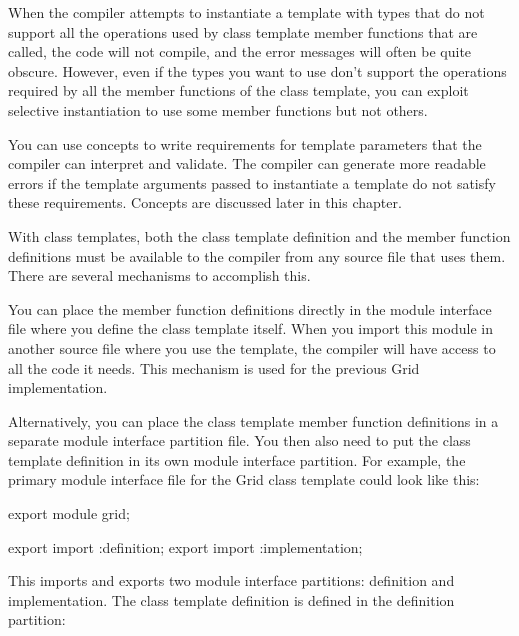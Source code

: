 When the compiler attempts to instantiate a template with types that do not support all the operations used by class template member functions that are called, the code will not compile, and the error messages will often be quite obscure. However, even if the types you want to use don’t support the operations required by all the member functions of the class template, you can exploit selective instantiation to use some member functions but not others.

You can use concepts to write requirements for template parameters that the compiler can interpret and validate. The compiler can generate more readable errors if the template arguments passed to instantiate a template do not satisfy these requirements. Concepts are discussed later in this chapter.


With class templates, both the class template definition and the member function definitions must be available to the compiler from any source file that uses them. There are several mechanisms to accomplish this.


You can place the member function definitions directly in the module interface file where you define the class template itself. When you import this module in another source file where you use the template, the compiler will have access to all the code it needs. This mechanism is used for the previous Grid implementation.


Alternatively, you can place the class template member function definitions in a separate module interface partition file. You then also need to put the class template definition in its own module interface partition. For example, the primary module interface file for the Grid class template could look like this:

\begin{cpp}
export module grid;

export import :definition;
export import :implementation;
\end{cpp}

This imports and exports two module interface partitions: definition and implementation. The class template definition is defined in the definition partition:

